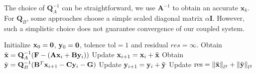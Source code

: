 The choice of $\mathbf{Q}_A^{-1}$ can be straightforward, we use $\mathbf{A}^{-1}$ to obtain an accurate $\mathbf{x}_k$.
For $\mathbf{Q}_B$, some approaches choose a simple scaled diagonal matrix $\alpha \mathbf{I}$. 
However, such a simplistic choice does not guarantee convergence of our coupled system.
\begin{algorithm}
		  \caption{Inexact Uzawa Iteration\label{alg:inexactuzawa}}
		  \begin{algorithmic}[1]
					 \State Initialize $\bold{x}_0 = \bold{0}$, $\bold{y}_0 = \bold{0}$, tolence $\text{tol} = 1$ and residual $res = \infty$.
					 \vspace{0.3cm}
					 \vspace{0.3cm}
					 \State Obtain $\tilde{\mathbf{x}} = \bold{Q}_A^{-1} (\bold{F} - (\bold{A}\bold{x}_i + \bold{B}\bold{y}_i))$
					 \vspace{0.3cm}
					 \State Update $\bold{x}_{i+1} = \bold{x}_i + \tilde{\mathbf{x}}$
					 \vspace{0.3cm}
					 \State Obtain $\tilde{\bold{y}} = \mathbf{Q}_B^{-1}(\bold{B}^T\bold{x}_{i+1} - \bold{C}\bold{y}_{i} - \bold{G})$
					 \vspace{0.3cm}
					 \State Update $\bold{y}_{i+1} = \bold{y}_i + \tilde{\bold{y}}$
					 \vspace{0.3cm}
					 \State Update $\text{res} = \left\lVert\tilde{\mathbf{x}}\right\rVert_{l^2} + 
					 \left\lVert\tilde{\mathbf{y}}\right\rVert_{l^2}$
					 \vspace{0.3cm}
					 \EndWhile
		  \end{algorithmic}
\end{algorithm}


